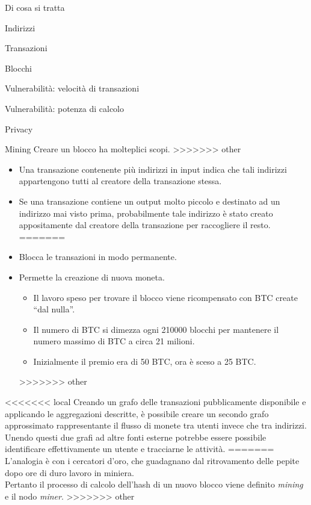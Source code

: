 \documentclass[italian]{beamer}
\begin{document}
\begin{frame}{Di cosa si tratta}
\begin{frame}{Indirizzi}
\begin{frame}{Transazioni}
\begin{frame}{Blocchi}
\begin{frame}{Vulnerabilità: velocità di transazioni}
\begin{frame}{Vulnerabilità: potenza di calcolo}
\begin{frame}{Privacy}
\begin{frame}{Mining}
Creare un blocco ha molteplici scopi.
\pause
>>>>>>> other
\begin{itemize}
<<<<<<< local
 \item Una transazione contenente più indirizzi in input indica che tali indirizzi appartengono tutti al creatore della transazione stessa.
 \item Se una transazione contiene un output molto piccolo e destinato ad un indirizzo mai visto prima, probabilmente tale indirizzo è stato creato appositamente dal creatore della transazione per raccogliere il resto.
=======
  \item Blocca le transazioni in modo permanente.
  \item Permette la creazione di nuova moneta.
  \begin{itemize}
    \item Il lavoro speso per trovare il blocco viene ricompensato con BTC create ``dal nulla''.
    \item Il numero di BTC si dimezza ogni 210000 blocchi per mantenere il numero massimo di BTC a circa 21 milioni.
    \item Inizialmente il premio era di 50 BTC, ora è sceso a 25 BTC.
  \end{itemize}
>>>>>>> other
\end{itemize}
<<<<<<< local
Creando un grafo delle transazioni pubblicamente disponibile e applicando le aggregazioni descritte, è possibile creare un secondo grafo approssimato rappresentante il flusso di monete tra utenti invece che tra indirizzi. Unendo questi due grafi ad altre fonti esterne potrebbe essere possibile identificare effettivamente un utente e tracciarne le attività.
=======
\bigskip
\pause L'analogia è con i cercatori d'oro, che guadagnano dal ritrovamento delle pepite dopo ore di duro lavoro in miniera. \\
\pause Pertanto il processo di calcolo dell'hash di un nuovo blocco viene definito \emph{mining} e il nodo \emph{miner}.
>>>>>>> other
\end{frame}


\end{frame}
\end{frame}
\end{frame}
\end{frame}
\end{frame}
\end{frame}
\end{frame}
\end{document}
